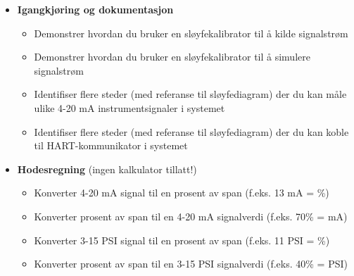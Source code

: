 \filbreak

\begin{itemize}
\item{} {\bf Igangkjøring og dokumentasjon}
\begin{itemize}

\item{} Demonstrer hvordan du bruker en sløyfekalibrator til å kilde signalstrøm
\item{} Demonstrer hvordan du bruker en sløyfekalibrator til å simulere signalstrøm
\item{} Identifiser flere steder (med referanse til sløyfediagram) der du kan måle ulike 4-20 mA instrumentsignaler i systemet
\item{} Identifiser flere steder (med referanse til sløyfediagram) der du kan koble til HART-kommunikator i systemet
\end{itemize}
\end{itemize}

\filbreak

\begin{itemize}
\item{} {\bf Hodesregning} (ingen kalkulator tillatt!)
\begin{itemize}

\item{} Konverter 4-20 mA signal til en prosent av span (f.eks. 13 mA = \underbar{\hskip 20pt}\%)
\item{} Konverter prosent av span til en 4-20 mA signalverdi (f.eks. 70\% = \underbar{\hskip 20pt} mA)
\item{} Konverter 3-15 PSI signal til en prosent av span (f.eks. 11 PSI = \underbar{\hskip 20pt}\%)
\item{} Konverter prosent av span til en 3-15 PSI signalverdi (f.eks. 40\% = \underbar{\hskip 20pt} PSI)
\end{itemize}
\end{itemize}

\filbreak

